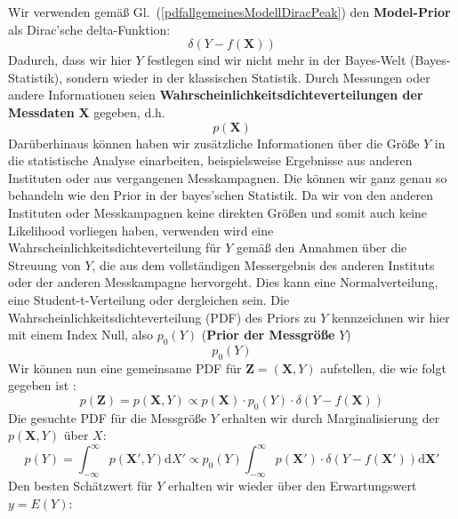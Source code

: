 Wir verwenden
gemäß Gl.~(\ref{pdfallgemeinesModellDiracPeak}) den \textbf{Model-Prior} als Dirac'sche delta-Funktion:
\begin{equation}
\delta(Y-f(\boldsymbol{X}))
\end{equation}
Dadurch, dass wir hier $Y$ festlegen sind wir nicht mehr in der
Bayes-Welt (Bayes-Statistik), sondern wieder in der klassischen
Statistik.
Durch Messungen oder andere Informationen seien
\textbf{Wahrscheinlichkeitsdichteverteilungen der Messdaten} $\boldsymbol{X}$
gegeben, d.h.
\begin{equation}
p(\boldsymbol{X})
\end{equation}
Darüberhinaus können haben wir zusätzliche Informationen über die Größe
$Y$ in die statistische Analyse einarbeiten, beispielsweise Ergebnisse
aus anderen Instituten oder aus vergangenen Messkampagnen.
Die können wir ganz genau so behandeln wie den Prior in der
bayes'schen Statistik. Da wir von den anderen Instituten oder Messkampagnen
keine direkten Größen und somit auch keine Likelihood vorliegen haben, verwenden
wird eine Wahrscheinlichkeitsdichteverteilung für $Y$ gemäß den Annahmen über
die Streuung von $Y$, die aus dem vollständigen Messergebnis des anderen Instituts oder
der anderen Messkampagne hervorgeht. Dies kann eine Normalverteilung, eine Student-t-Verteilung
oder dergleichen sein. Die Wahrscheinlichkeitsdichteverteilung (PDF) des
Priors zu $Y$ kennzeichnen wir hier mit einem Index
\glqq Null\grqq, also $p_0(Y)$ (\textbf{Prior der Messgröße} $Y$)
\begin{equation}
p_0(Y)
\end{equation}
Wir können nun eine gemeinsame PDF für $\boldsymbol{Z} = (\boldsymbol{X},Y)$
aufstellen, die wie folgt gegeben ist \cite{Els07}:
\begin{equation}
p(\boldsymbol{Z}) = p(\boldsymbol{X},Y) \propto p(\boldsymbol{X}) \cdot p_0(Y) \cdot \delta(Y-f(\boldsymbol{X}))
\end{equation}
Die gesuchte PDF für die Messgröße $Y$ erhalten wir durch Marginalisierung der $p(\boldsymbol{X},Y)$ über $X$:
\begin{equation}
p(Y) = \int_{-\infty}^{\infty} p(\boldsymbol{X'},Y) \mathrm{d} X'
\propto p_0(Y)\int_{-\infty}^{\infty}  p(\boldsymbol{X'}) \cdot \delta(Y-f(\boldsymbol{X'})) \mathrm{d} \boldsymbol{X'}
\label{eq:pdf_Y_durch_Marginalisierung}
\end{equation}
Den besten Schätzwert für $Y$ erhalten wir wieder über den
Erwartungswert $y=E(Y)$:
